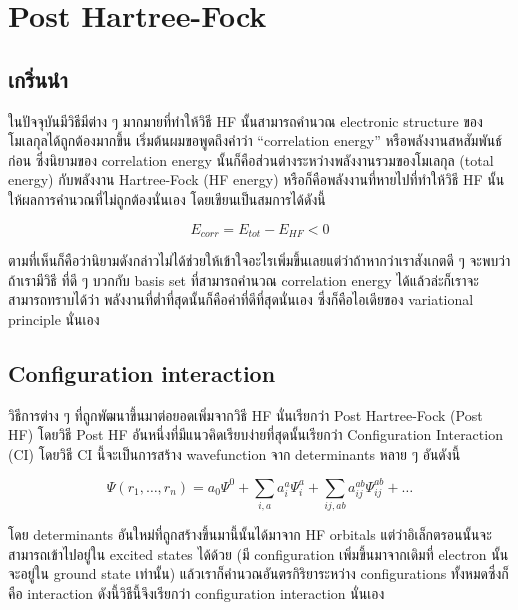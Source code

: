 
\chapter{Post Hartree-Fock}

\section{เกริ่นนำ}

ในปัจจุบันมีวิธีมีต่าง ๆ มากมายที่ทำให้วิธี HF นั้นสามารถคำนวณ electronic structure ของโมเลกุลได้ถูกต้องมากขึ้น
เริ่มต้นผมขอพูดถึงคำว่า \enquote{correlation energy} หรือพลังงานสหสัมพันธ์ก่อน ซึ่งนิยามของ correlation
energy นั้นก็คือส่วนต่างระหว่างพลังงานรวมของโมเลกุล (total energy) กับพลังงาน Hartree-Fock (HF energy)
หรือก็คือพลังงานที่หายไปที่ทำให้วิธี HF นั้นให้ผลการคำนวณที่ไม่ถูกต้องนั่นเอง โดยเขียนเป็นสมการได้ดังนี้

\begin{equation}
    E_{corr} = E_{tot} - E_{HF} < 0
\end{equation}

ตามที่เห็นก็คือว่านิยามดังกล่าวไม่ได้ช่วยให้เข้าใจอะไรเพิ่มขึ้นเลยแต่ว่าถ้าหากว่าเราสังเกตดี ๆ จะพบว่าถ้าเรามีวิธี%
ที่ดี ๆ บวกกับ basis set ที่สามารถคำนวณ correlation energy ได้แล้วล่ะก็เราจะสามารถทราบได้ว่า%
พลังงานที่ต่ำที่สุดนั้นก็คือค่าที่ดีที่สุดนั่นเอง ซึ่งก็คือไอเดียของ variational principle นั่นเอง

\section{Configuration interaction}

วิธีการต่าง ๆ ที่ถูกพัฒนาขึ้นมาต่อยอดเพิ่มจากวิธี HF นั่นเรียกว่า Post Hartree-Fock (Post HF)
โดยวิธี Post HF อันหนึ่งที่มีแนวคิดเรียบง่ายที่สุดนั้นเรียกว่า Configuration Interaction (CI)
โดยวิธี CI นี้จะเป็นการสร้าง wavefunction จาก determinants หลาย ๆ อันดังนี้

\begin{equation}
    \Psi(r_{1}, \dots, r_{n})
    =
    a_{0} \Psi^{0}
    + \sum_{i,a} a^{a}_{i} \Psi^{a}_{i}
    + \sum_{ij,ab} a^{ab}_{ij} \Psi^{ab}_{ij}
    + \dots
\end{equation}

โดย determinants อันใหม่ที่ถูกสร้างขึ้นมานี้นั้นได้มาจาก HF orbitals แต่ว่าอิเล็กตรอนนั้นจะสามารถเข้าไปอยู่ใน
excited states ได้ด้วย (มี configuration เพิ่มขึ้นมาจากเดิมที่ electron นั้นจะอยู่ใน ground state
เท่านั้น) แล้วเราก็คำนวณอันตรกิริยาระหว่าง configurations ทั้งหมดซึ่งก็คือ interaction ดังนี้วิธีนี้จึงเรียกว่า
configuration interaction นั่นเอง

